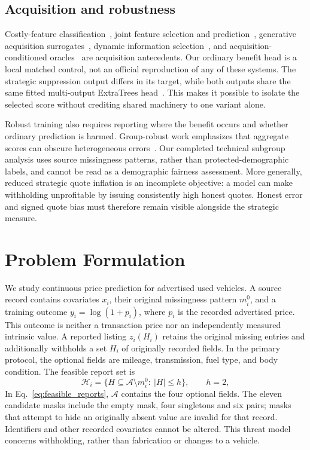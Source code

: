 \documentclass[10pt,journal]{IEEEtran}
\begin{document}
\subsection{Acquisition and robustness}
Costly-feature classification~\cite{janisch2019costly}, joint feature
selection and prediction~\cite{shim2018joint}, generative acquisition
surrogates~\cite{li2021gsm}, dynamic information
selection~\cite{covert2023information}, and acquisition-conditioned
oracles~\cite{valancius2024aco} are acquisition antecedents. Our ordinary
benefit head is a local matched control, not an official reproduction of
any of these systems. The strategic suppression output differs in its
target, while both outputs share the same fitted multi-output
ExtraTrees head~\cite{geurts2006extratrees}. This makes it possible to
isolate the selected score without crediting shared machinery to one
variant alone.

Robust training also requires reporting where the benefit occurs and
whether ordinary prediction is harmed. Group-robust work emphasizes
that aggregate scores can obscure heterogeneous
errors~\cite{sagawa2019groups}. Our completed technical subgroup analysis
uses source missingness patterns, rather than protected-demographic
labels, and cannot be read as a demographic fairness assessment. More
generally, reduced strategic quote inflation is an incomplete objective:
a model can make withholding unprofitable by issuing consistently high
honest quotes. Honest error and signed quote bias must therefore remain
visible alongside the strategic measure.

\section{Problem Formulation}
We study continuous price prediction for advertised used vehicles. A source
record contains covariates $x_i$, their original missingness pattern $m_i^0$,
and a training outcome $y_i=\log(1+p_i)$, where $p_i$ is the recorded advertised
price. This outcome is neither a transaction price nor an independently
measured intrinsic value. A reported listing $z_i(H_i)$ retains the original
missing entries and additionally withholds a set $H_i$ of originally recorded
fields. In the primary protocol, the optional fields are mileage,
transmission, fuel type, and body condition. The feasible report set is
\begin{equation}
\mathcal H_i=\{H\subseteq\mathcal A\setminus m_i^0:\ |H|\leq h\},
\qquad h=2,
\label{eq:feasible_reports}
\end{equation}
In Eq.~\eqref{eq:feasible_reports}, $\mathcal A$ contains the four optional
fields. The eleven candidate
masks include the empty mask, four singletons and six pairs; masks that
attempt to hide an originally absent value are invalid for that record.
Identifiers and other recorded covariates cannot be altered. This threat
model concerns withholding, rather than fabrication or changes to a vehicle.
\end{document}
